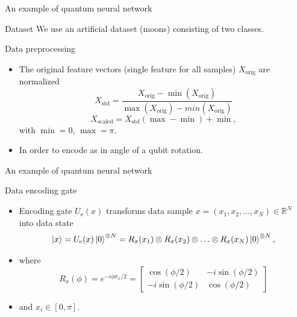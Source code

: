 \begin{frame}{An example of quantum neural network}
\begin{block}{Dataset}
	We use an artificial dataset (moons) consisting of  two classes.
\end{block}
\begin{block}{Data preprocessing}
	\begin{itemize}
		\item The original feature vectors (single feature for all samples) 
		$X_\mathrm{orig}$ are normalized
		$$X_\mathrm{std} = \frac{X_\mathrm{orig} - \min(X_\mathrm{orig})}
							{\max(X_\mathrm{orig}) - min(X_\mathrm{orig})}$$
		$$X_\mathrm{scaled} = X_\mathrm{std} (\max - \min) + \min,$$
		with $\min = 0$, $\max = \pi$.  
		\item In order to encode as in angle of a qubit rotation.
	\end{itemize}
\end{block}
\end{frame}
\begin{frame}{An example of quantum neural network}
\begin{block}{Data encoding gate}
\begin{itemize}
	\item Encoding gate $U_{\mathrm{e}}(x)$ 
	transforms data sample
	$x=(x_1, x_2, \ldots, x_N)\in \mathbb{R}^N$
	into data state
	$$\ket{x} = U_{\mathrm{e}}(x)\ket{0}^{\otimes N} = 
	R_x(x_1)\otimes R_x(x_2) \otimes \ldots \otimes R_x(x_N) 
	\ket{0}^{\otimes N},
	$$
	\item where 
	$$R_x(\phi) = e^{-i\phi\sigma_x/2} = 
	  \begin{bmatrix}
		\cos(\phi/2) & -i\sin(\phi/2) \\
		-i\sin(\phi/2) & \cos(\phi/2)
	\end{bmatrix}
	$$
	\item and $x_i\in[0,\pi]$.
\end{itemize}
\end{block}
\end{frame}

